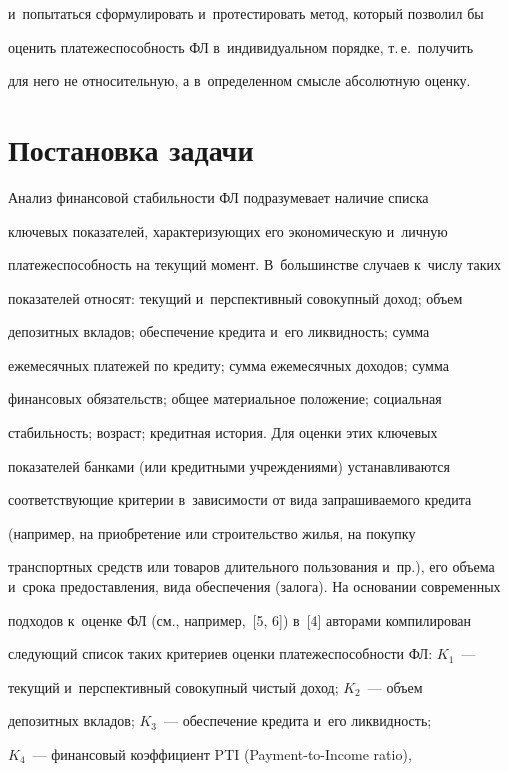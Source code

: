 и~попытаться сформулировать и~про\-тес\-ти\-ро\-вать метод, который позволил бы 

оценить платежеспособность ФЛ в~индивидуальном порядке, т.\,е.\ получить 

для него не относительную, а в~определенном смысле абсолютную оценку.

  

\section{Постановка задачи}



  Анализ финансовой стабильности ФЛ подразумевает наличие списка 

ключевых показателей, характеризующих его экономическую и~личную 

платежеспособность на текущий момент. В~большинстве случаев к~числу таких 

показателей относят: текущий и~перспективный совокупный доход; объем 

депозитных вкладов; обеспечение кредита и~его ликвидность; сумма 

ежемесячных платежей по кредиту; сумма ежемесячных доходов; сумма 

финансовых обязательств; общее материальное положение; социальная 

стабильность; возраст; кредитная история. Для оценки этих ключевых 

показателей банками (или кредитными учреж\-де\-ни\-ями) устанавливаются 

соответствующие критерии в~зависимости от вида запрашиваемого кредита 

(например, на приобретение или строительство жилья, на покупку 

транспортных средств или товаров длительного пользования и~пр.), его объема и~срока предоставления, вида обеспечения (залога). На основании современных 

подходов к~оценке ФЛ (см., например,~[5, 6]) в~[4] авторами компилирован 

следующий список таких критериев оценки платежеспособности ФЛ: $K_1$~--- 

текущий и~перспективный совокупный чистый доход; $K_2$~--- объем 

депозитных вкладов; $K_3$~--- обеспечение кредита и~его ликвидность; 

$K_4$~--- финансовый коэффициент PTI (Payment-to-Income ratio),  

